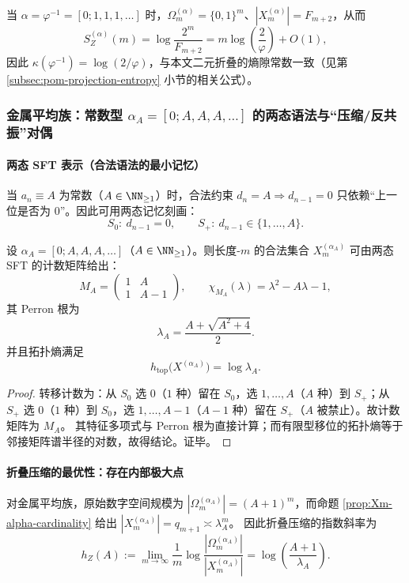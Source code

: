 \begin{remark}[黄金分支为最简周期特例]
当 $\alpha=\varphi^{-1}=[0;1,1,1,\dots]$ 时，$\Omega_m^{(\alpha)}=\{0,1\}^m$、$|X_m^{(\alpha)}|=F_{m+2}$，从而
\[
S_Z^{(\alpha)}(m)=\log\frac{2^m}{F_{m+2}}
=m\log\!\left(\frac{2}{\varphi}\right)+O(1),
\]
因此 $\kappa(\varphi^{-1})=\log(2/\varphi)$，与本文二元折叠的熵隙常数一致（见第 \ref{subsec:pom-projection-entropy} 小节的相关公式）。
\end{remark}

\subsubsection{金属平均族：常数型 \texorpdfstring{$\alpha_A=[0;A,A,A,\dots]$}{alphaA} 的两态语法与“压缩/反共振”对偶}

\paragraph{两态 SFT 表示（合法语法的最小记忆）}
当 $a_n\equiv A$ 为常数（$A\in\NN_{\ge 1}$）时，合法约束
\(
d_n=A\Rightarrow d_{n-1}=0
\)
只依赖“上一位是否为 $0$”。因此可用两态记忆刻画：
\[
S_0:\ d_{n-1}=0,\qquad S_+:\ d_{n-1}\in\{1,\dots,A\}.
\]

\begin{proposition}\label{prop:metallic-two-state-sft}
设 $\alpha_A=[0;A,A,A,\dots]$（$A\in\NN_{\ge 1}$）。则长度-$m$ 的合法集合 $X_m^{(\alpha_A)}$ 可由两态 SFT 的计数矩阵给出：
\[
M_A=
\begin{pmatrix}
1 & A\\
1 & A-1
\end{pmatrix},
\qquad
\chi_{M_A}(\lambda)=\lambda^2-A\lambda-1,
\]
其 Perron 根为
\[
\lambda_A=\frac{A+\sqrt{A^2+4}}{2}.
\]
并且拓扑熵满足
\[
h_{\mathrm{top}}\bigl(X^{(\alpha_A)}\bigr)=\log\lambda_A.
\]
\end{proposition}
\begin{proof}
转移计数为：从 $S_0$ 选 $0$（$1$ 种）留在 $S_0$，选 $1,\dots,A$（$A$ 种）到 $S_+$；从 $S_+$ 选 $0$（$1$ 种）到 $S_0$，选 $1,\dots,A-1$（$A-1$ 种）留在 $S_+$（$A$ 被禁止）。故计数矩阵为 $M_A$。
其特征多项式与 Perron 根为直接计算；而有限型移位的拓扑熵等于邻接矩阵谱半径的对数，故得结论。证毕。
\end{proof}

\paragraph{折叠压缩的最优性：存在内部极大点}
对金属平均族，原始数字空间规模为 $|\Omega_m^{(\alpha_A)}|=(A+1)^m$，而命题 \ref{prop:Xm-alpha-cardinality} 给出
\(
|X_m^{(\alpha_A)}|=q_{m+1}\asymp \lambda_A^m
\)。
因此折叠压缩的指数斜率为
\[
h_Z(A):=\lim_{m\to\infty}\frac{1}{m}\log\frac{|\Omega_m^{(\alpha_A)}|}{|X_m^{(\alpha_A)}|}
=\log\!\left(\frac{A+1}{\lambda_A}\right).
\]

